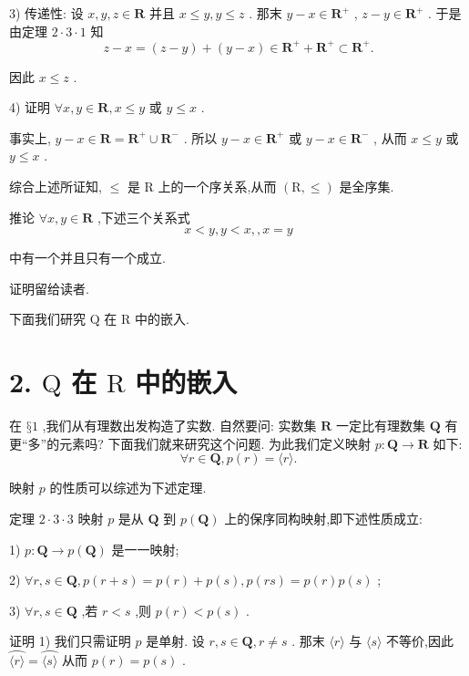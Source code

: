 3) 传递性: 设 $x,y,z \in  \mathbf{R}$ 并且 $x \leq  y,y \leq  z$ . 那末 $y - x \in  {\mathbf{R}}^{ + }$ , $z - y \in  {\mathbf{R}}^{ + }$ . 于是由定理 $2 \cdot  3 \cdot  1$ 知
$$z - x = \left( {z - y}\right)  + \left( {y - x}\right)  \in  {\mathbf{R}}^{ + } + {\mathbf{R}}^{ + } \subset  {\mathbf{R}}^{ + }.$$

因此 $x \leq  z$ .

4) 证明 $\forall x,y \in  \mathbf{R},x \leq  y$ 或 $y \leq  x$ .

事实上, $y - x \in  \mathbf{R} = {\mathbf{R}}^{ + } \cup  {\mathbf{R}}^{ - }$ . 所以 $y - x \in  {\mathbf{R}}^{ + }$ 或 $y - x \in  {\mathbf{R}}^{ - }$ , 从而 $x \leq  y$ 或 $y \leq  x$ .

综合上述所证知, $\leq$ 是 $\mathrm{R}$ 上的一个序关系,从而 $\left( {\mathrm{R}, \leq  }\right)$ 是全序集.

推论 $\forall x,y \in  \mathbf{R}$ ,下述三个关系式
$$x < y,y < x,,x = y$$

中有一个并且只有一个成立.

证明留给读者.

下面我们研究 $\mathrm{Q}$ 在 $\mathrm{R}$ 中的嵌入.

\section*{2. $\mathrm{Q}$ 在 $\mathrm{R}$ 中的嵌入}

在 $§1$ ,我们从有理数出发构造了实数. 自然要问: 实数集 $\mathbf{R}$ 一定比有理数集 $\mathbf{Q}$ 有更“多”的元素吗? 下面我们就来研究这个问题. 为此我们定义映射 $p : \mathbf{Q} \rightarrow  \mathbf{R}$ 如下:
$$\forall r \in  \mathbf{Q},p\left( r\right)  = \langle r\rangle .$$

映射 $p$ 的性质可以综述为下述定理.

定理 $2 \cdot  3 \cdot  3$ 映射 $p$ 是从 $\mathbf{Q}$ 到 $p\left( \mathbf{Q}\right)$ 上的保序同构映射,即下述性质成立:

1) $p : \mathbf{Q} \rightarrow  p\left( \mathbf{Q}\right)$ 是一一映射;

2) $\forall r,s \in  \mathbf{Q},p\left( {r + s}\right)  = p\left( r\right)  + p\left( s\right) ,p\left( {rs}\right)  = p\left( r\right) p\left( s\right)$ ;

3) $\forall r,s \in  \mathbf{Q}$ ,若 $r < s$ ,则 $p\left( r\right)  < p\left( s\right)$ .

证明 1) 我们只需证明 $p$ 是单射. 设 $r,s \in  \mathbf{Q},r \neq  s$ . 那末 $\langle r\rangle$ 与 $\langle s\rangle$ 不等价,因此 $\overset{⏜}{\langle r\rangle } = \overset{⏜}{\langle s\rangle }$ 从而 $p\left( r\right)  = p\left( s\right)$ .

